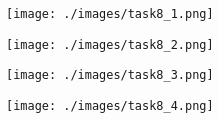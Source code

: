 \begin{figure}[!ht]
    \centering
    \texttt{[image: ./images/task8\_1.png]}
\end{figure}

\begin{figure}[!ht]
    \centering
    \texttt{[image: ./images/task8\_2.png]}
\end{figure}

\begin{figure}[!ht]
    \centering
    \texttt{[image: ./images/task8\_3.png]}
\end{figure}

\begin{figure}[!ht]
    \centering
    \texttt{[image: ./images/task8\_4.png]}
\end{figure}
